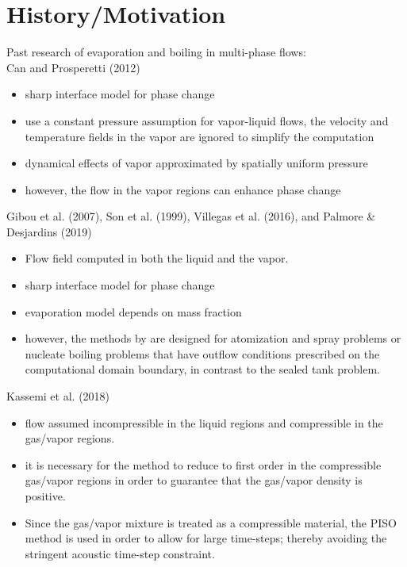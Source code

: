 \documentclass[]{article}
\begin{document}
\FloatBarrier
		
\section*{History/Motivation} 
Past research of evaporation and boiling in multi-phase flows:\\
Can and Prosperetti (2012)\cite{CAN2012}
\begin{itemize}
\item sharp interface model for phase change
\item use a constant pressure assumption for vapor-liquid flows, 
  the velocity and temperature fields in the vapor are 
  ignored to simplify the computation 
\item dynamical effects of vapor approximated by spatially uniform pressure
\item however, the flow in the vapor regions can enhance phase change
\end{itemize}
Gibou et al. (2007)\cite{GIBOU2007}, 
Son et al. (1999)\cite{Son1999}, 
Villegas et al. (2016)\cite{VILLEGAS2016}, and 
Palmore \& Desjardins (2019)\cite{PALMORE2019}
\begin{itemize}
\item Flow field computed in both the liquid and the vapor.
\item sharp interface model for phase change
\item evaporation model depends on mass fraction
\item however, the methods by 
  \cite{GIBOU2007,Son1999,VILLEGAS2016,PALMORE2019} are 
  designed for atomization and spray problems or nucleate boiling problems
  that have outflow conditions prescribed on the computational domain
  boundary, in contrast to the sealed tank problem.
\end{itemize}
Kassemi et al. (2018)\cite{KASSEMI2018}
\begin{itemize}
\item flow assumed incompressible in the liquid 
  regions and compressible in the gas/vapor regions.
\item it is necessary for the method to reduce to first order in the
  compressible gas/vapor regions in order to guarantee that the gas/vapor 
  density is positive.
\item Since the gas/vapor mixture
  is treated as a compressible material, the 
  PISO method is used in order to allow for large time-steps; 
  thereby avoiding the stringent acoustic time-step constraint.
\end{itemize}
	
\end{document}
